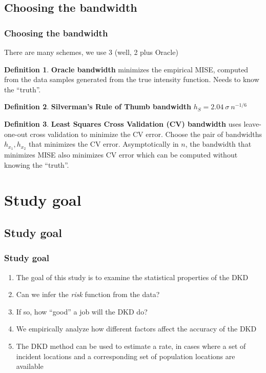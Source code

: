 \documentclass[notheorems]{beamer}
\theoremstyle{definition}
\newtheorem{definition}{Definition}
\theoremstyle{example}
\begin{document}
\subsection{Choosing the bandwidth}
\begin{frame}\frametitle{Choosing the bandwidth}
    \small
    There are many schemes, we use 3 (well, 2 plus Oracle)
    \begin{definition}
        \textbf{Oracle bandwidth} minimizes the empirical MISE,
        computed from the data samples generated from the true intensity function.
        Needs to know the ``truth''.
    \end{definition}
    \begin{definition}
        \textbf{Silverman's Rule of Thumb bandwidth} $h_S = 2.04~\sigma~n^{-1/6}$
    \end{definition}
    \begin{definition}
        \textbf{Least Squares Cross Validation (CV) bandwidth} uses leave-one-out cross validation to minimize the CV error.
            Choose the pair of bandwidths $h_{x_1}, h_{x_2}$ that minimizes the CV error.
            Asymptotically in $n$, the bandwidth that minimizes MISE also minimizes CV error which can be computed without knowing the ``truth''.
    \end{definition}
\end{frame}

\section{Study goal}

\subsection{Study goal}
\begin{frame}\frametitle{Study goal}
    \begin{enumerate}
        \item The goal of this study is to examine the statistical properties of the DKD
        \item Can we infer the \emph{risk} function from the data?
        \item If so, how ``good'' a job will the DKD do?
        \item We empirically analyze how different factors affect the accuracy of the DKD
        \item The DKD method can be used to estimate a rate,
            in cases where a set of incident locations and a corresponding set of population locations are available 
    \end{enumerate}
\end{frame}
\end{document}
